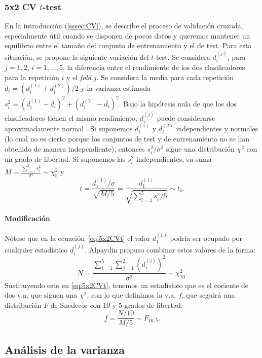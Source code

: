 \subsubsection{5x2 CV $t$-test}
	
	En la introducción (\ref{sssec:CV}), se describe el 
proceso de validación cruzada, especialmente útil cuando se
disponen de pocos datos y queremos mantener un equilibrio
entre el tamaño del conjunto de entrenamiento y el de test.
Para esta situación, se propone la siguiente variación 
del $t$-test. Se considera $d_i^{(j)}$, para $j=1,2$, $i=
1,\dots,5$, la diferencia entre el rendimiento de los dos
clasificadores para la repetición $i$ y el \textit{fold} $j$.
Se considera la media para cada repetición $\bar{d}_i = 
(d_i^{(1)} + d_i^{(2)})/2$ y la varianza estimada
$s_i^2 = (d_i^{(1)}-\bar{d_i})^2 + (d_i^{(2)}-\bar{d_i})^2$. 
Bajo la hipótesis nula de que los dos clasificadores tienen 
el mismo rendimiento, $d_i^{(j)}$ puede considerarse 
aproximadamente normal . Si suponemos $d_i^{(1)}$ y 
$d_i^{(2)}$ independientes y normales (lo cual no es
cierto porque los conjuntos de test y de entrenamiento
no se han obtenido de manera independiente), entonces
$s_i^2/\sigma^2$ sigue una distribución $\chi^2$ con un
grado de libertad. Si suponemos las $s_i^2$ independientes,
su suma $M = \frac{\sum\limits_{i=1}^5 s_i^2}{\sigma^2}
\sim \chi^2_5$ y 
\begin{equation}
	\label{eq:5x2CVt}
	t = \frac{d_1^{(1)}/\sigma}{\sqrt{M/5}} = 
		\frac{d_1^{(1)}}
			{\sqrt{\sum\limits_{i=1}^5 s_i^2/5}}
		\sim t_5.
\end{equation}

\paragraph{Modificación} Nótese que en la 
ecuación~\ref{eq:5x2CVt} el valor $d_1^{(1)}$ podría ser
ocupado por cualquier estadístico $d_i^{(j)}$. Alpaydin
propuso combinar estos valores de la forma:
	\[
		N = \frac{\sum\limits_{i=1}^5
				\sum\limits_{j=1}^2
					\left( d_i^{(j)} \right)^2}
				{\sigma^2}
			\sim \chi_{10}^2.
	\]
	Sustituyendo esto en \ref{eq:5x2CVt}, tenemos
un estadístico que es el cociente de dos v.a. que siguen 
una $\chi^2$, con lo que definimos la v.a. $f$, que seguirá
una distribución $F$ de Snedecor con 10 y 5 grados de
libertad:
	\[ 
		f = \frac{N/10}{M/5} \sim F_{10,5}.
	\]
	
		
\subsection{Análisis de la varianza}

